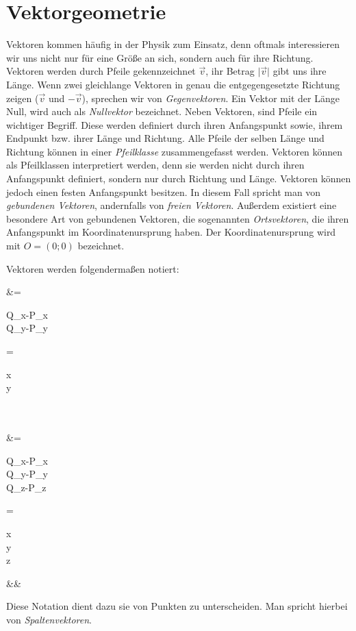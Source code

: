 \documentclass[12pt]{article}
\begin{document}
	\section{Vektorgeometrie}
	\label{sec:vektorgeometrie}
		Vektoren kommen häufig in der Physik zum Einsatz, denn oftmals interessieren wir uns nicht nur für eine Größe an sich, sondern auch für ihre Richtung. Vektoren werden durch Pfeile gekennzeichnet $\vec v$, ihr Betrag $\vert\vec v\vert$ gibt uns ihre Länge. Wenn zwei gleichlange Vektoren in genau die entgegengesetzte Richtung zeigen ($\vec v$ und $-\vec v$), sprechen wir von \textit{Gegenvektoren}. Ein Vektor mit der Länge Null, wird auch als \textit{Nullvektor} bezeichnet. Neben Vektoren, sind Pfeile ein wichtiger Begriff. Diese werden definiert durch ihren Anfangspunkt sowie, ihrem Endpunkt bzw. ihrer Länge und Richtung. Alle Pfeile der selben Länge und Richtung können in einer \textit{Pfeilklasse} zusammengefasst werden. Vektoren können als Pfeilklassen interpretiert werden, denn sie werden nicht durch ihren Anfangspunkt definiert, sondern nur durch Richtung und Länge. Vektoren können jedoch einen festen Anfangspunkt besitzen. In diesem Fall spricht man von \textit{gebundenen Vektoren}, andernfalls von \textit{freien Vektoren}. Außerdem existiert eine besondere Art von gebundenen Vektoren, die sogenannten \textit{Ortsvektoren}, die ihren Anfangspunkt im Koordinatenursprung haben. Der Koordinatenursprung wird mit $O=(0;0)$ bezeichnet.
		\begin{tcolorbox}[boxsep=0pt,top=.75cm,left=1cm,right=1cm, bottom=.75cm,arc=0pt,auto outer arc,colback=white,colframe=black, enlarge top by=.25cm, enlarge bottom by=.25cm]
			Vektoren werden folgendermaßen notiert:
			\begin{flalign*}
				&=\begin{pmatrix}Q_x-P_x\\Q_y-P_y\end{pmatrix}=\begin{pmatrix}x\\y\end{pmatrix}\\\\
				&=\begin{pmatrix}Q_x-P_x\\Q_y-P_y\\Q_z-P_z\end{pmatrix}=\begin{pmatrix}x\\y\\z\end{pmatrix}&&
			\end{flalign*}
			Diese Notation dient dazu sie von Punkten zu unterscheiden. Man spricht hierbei von \textit{Spaltenvektoren}.
		\end{tcolorbox}
\end{document}
